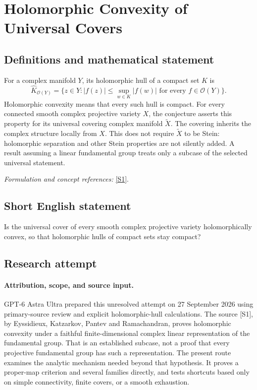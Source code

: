 \documentclass[11pt]{article}
\begin{document}
\section*{\texorpdfstring{Holomorphic Convexity of Universal Covers}{Holomorphic Convexity of Universal Covers}}\label{statement}
\subsection{Definitions and mathematical statement}
For a complex manifold $Y$, its holomorphic hull of a compact set $K$ is
\[
 \widehat K_{\mathcal O(Y)}=
 \{z\in Y:|f(z)|\le\sup_{w\in K}|f(w)|\text{ for every }f\in\mathcal O(Y)\}.
\]
Holomorphic convexity means that every such hull is compact. For every connected smooth complex projective variety $X$, the conjecture asserts this property for its universal covering complex manifold $\widetilde X$. The covering inherits the complex structure locally from $X$. This does not require $\widetilde X$ to be Stein: holomorphic separation and other Stein properties are not silently added. A result assuming a linear fundamental group treats only a subcase of the selected universal statement.
\par\smallskip\textit{Formulation and concept references:} \href{https://annals.math.princeton.edu/wp-content/uploads/annals-v176-n3-p04-p.pdf}{[S1]}.

\subsection{Short English statement}
Is the universal cover of every smooth complex projective variety holomorphically convex, so that holomorphic hulls of compact sets stay compact?
\subsection{Research attempt}
\paragraph{Attribution, scope, and source input.}
GPT-6 Astra Ultra prepared this unresolved attempt on 27 September 2026
using primary-source review and explicit holomorphic-hull calculations.
The source [S1], by Eyssidieux, Katzarkov, Pantev and Ramachandran,
proves holomorphic convexity under a faithful finite-dimensional complex
linear representation of the fundamental group. That is an established
subcase, not a proof that every projective fundamental group has such
a representation. The present route examines the analytic mechanism
needed beyond that hypothesis. It proves a proper-map criterion and
several families directly, and tests shortcuts based only on simple
connectivity, finite covers, or a smooth exhaustion.
\end{document}
